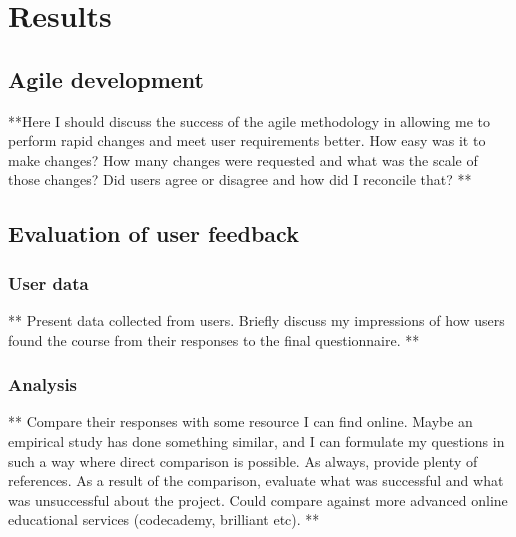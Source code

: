 \chapter{Results}
\label{chapter3}


\section{Agile development}
**Here I should discuss the success of the agile methodology in allowing me to perform rapid changes and meet user requirements better. How easy was it to make changes? How many changes were requested and what was the scale of those changes? Did users agree or disagree and how did I reconcile that? **

\section{Evaluation of user feedback}

\subsection{User data}
** Present data collected from users. Briefly discuss my impressions of how users found the course from their responses to the final questionnaire. **

\subsection{Analysis}
** Compare their responses with some resource I can find online. Maybe an empirical study has done something similar, and I can formulate my questions in such a way where direct comparison is possible. As always, provide plenty of references. As a result of the comparison, evaluate what was successful and what was unsuccessful about the project. Could compare against more advanced online educational services (codecademy, brilliant etc). ** 

